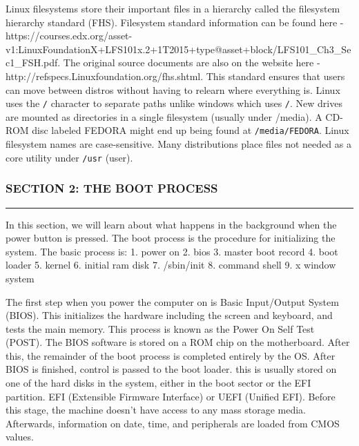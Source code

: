 Linux filesystems store their important files in a hierarchy called the
filesystem hierarchy standard (FHS). Filesystem standard information can
be found here -
https://courses.edx.org/asset-v1:LinuxFoundationX+LFS101x.2+1T2015+type@asset+block/LFS101\_Ch3\_Sec1\_FSH.pdf.
The original source documents are also on the website here -
http://refspecs.Linuxfoundation.org/fhs.shtml. This standard ensures
that users can move between distros without having to relearn where
everything is. Linux uses the \texttt{/} character to separate paths
unlike windows which uses \texttt{/}. New drives are mounted as
directories in a single filesystem (usually under /media). A CD-ROM disc
labeled FEDORA might end up being found at \texttt{/media/FEDORA}. Linux
filesystem names are case-sensitive. Many distributions place files not
needed as a core utility under \texttt{/usr} (user).

\subsubsection{SECTION 2: THE BOOT
PROCESS}\label{section-2-the-boot-process}

\begin{center}\rule{3in}{0.4pt}\end{center}

In this section, we will learn about what happens in the background when
the power button is pressed. The boot process is the procedure for
initializing the system. The basic process is: 1. power on 2. bios 3.
master boot record 4. boot loader 5. kernel 6. initial ram disk 7.
/sbin/init 8. command shell 9. x window system

The first step when you power the computer on is Basic Input/Output
System (BIOS). This initializes the hardware including the screen and
keyboard, and tests the main memory. This process is known as the Power
On Self Test (POST). The BIOS software is stored on a ROM chip on the
motherboard. After this, the remainder of the boot process is completed
entirely by the OS. After BIOS is finished, control is passed to the
boot loader. this is usually stored on one of the hard disks in the
system, either in the boot sector or the EFI partition. EFI (Extensible
Firmware Interface) or UEFI (Unified EFI). Before this stage, the
machine doesn't have access to any mass storage media. Afterwards,
information on date, time, and peripherals are loaded from CMOS values.

